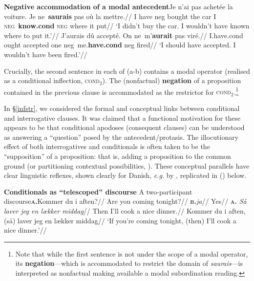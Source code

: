 \pex[aboveglftskip=0pt]\textbf{Negative accommodation of a modal antecedent}\a\begingl\gla Je n'ai pas achetée la voiture. Je ne~\textbf{saurais} pas où la mettre.//
\glb I \textsc{}have \gls{neg} bought the car I \textsc{neg}~\textbf{know.\gls{cond}} \textsc{neg} where it put//
\glft`I didn't buy the car. I wouldn't have known where to put it.'//\endgl
\a\begingl\gla J'aurais dû accepté. On ne~m'\textbf{aurait} pas viré.//
\glb I.have.\gls{cond} ought accepted one \gls{neg}~me.\textbf{have.\gls{cond}} \gls{neg} fired//
\glft`I should have accepted. I wouldn't have been fired.'//\endgl\xe

\noindent Crucially, the second sentence in each of (a-b) contains a modal operator (realised as a conditional inflection, \textsc{cond$ _2 $}). The (nonfactual) \textbf{negation} of a proposition contained in the previous clause is accommodated as the restrictor for \textsc{cond$ _2 $}.\footnote{Note that while the first sentence is not under the scope of a modal operator, its \textbf{negation}---which is accommodated to restrict the domain of \textit{saurais}---is interpreted as nonfactual making available a modal subordination reading.}

In \S \ref{infstr}, we considered the formal and conceptual links between conditional and interrogative clauses. It was claimed that a functional motivation for these appears to be that conditional apodoses (consequent clauses) can be understood as answering a ``question'' posed by the antecedent/protasis. The illocutionary effect of both interrogatives and conditionals is often taken to be the ``supposition'' of a proposition: that is, adding a proposition to the common ground (or partitioning contextual possibilities, \citealp[see][]{Starr2010}).
These conceptual parallels have clear linguistic reflexes, shown clearly for Danish, \textit{e.g.} by \citet[100-2]{Harder1995}, replicated in () below.

\pex[aboveglftskip=0pt]\textbf{Conditionals as ``telescoped'' discourse}\a\textup{ A two-participant discourse}\beginsubsub\b{\textsc{\textbf{a.}}}\begingl\gla Kommer du i aften?//
\glft Are you coming tonight?//\endgl
\b{\textbf{\textsc{b.}}}\begingl\gla \textit{ja}//
\glft Yes//\endgl
\b{\textbf{\textsc{a.}}}\begingl\gla\textit{ Så laver jeg en lækker middag}//
\glft Then I'll cook a nice dinner.//\endgl\endsubsub
\a\begingl{}\gla Kommer du i aften, (så) laver jeg en lækker middag//
\glft `If you're coming tonight, (then) I'll cook a nice dinner.'//\endgl
\xe

